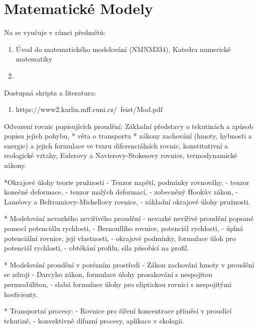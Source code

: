 \part{Matematické Modely} 

Na se vyučuje v rámci předmětů:

\begin{enumerate}
    \item Úvod do matematického modelování (NMNM334), Katedra numerické matematiky
    \item 
\end{enumerate}

Dostupná skripta a literatura:

\begin{enumerate}
    \item https://www2.karlin.mff.cuni.cz/~feist/Mod.pdf
\end{enumerate}

Odvození rovnic popisujících proudění:
Základní představy o tekutinách a způsob popisu jejich pohybu, 
* věta o transportu 
* zákony zachování (hmoty, hybnosti a energie) a jejich formulace ve tvaru diferenciálních rovnic, konstitutivní a reologické vztahy, Eulerovy a Navierovy-Stokesovy rovnice, termodynamické zákony.

*Okrajové úlohy teorie pružnosti
  - Tenzor napětí, podmínky rovnováhy, 
  - tenzor konečné deformace, 
  - tenzor malých deformací, 
  - zobecněný Hookův zákon, 
  - Laméovy a Beltramiovy-Michellovy rovnice, 
  - základní okrajové úlohy pružnosti.

* Modelování nevazkého neviřivého proudění
  - nevazké nevířivé proudění popsané pomocí potenciálu rychlosti, 
  - Bernoulliho rovnice, potenciál rychlosti, 
  - úplná potenciální rovnice, její vlastnosti, 
  - okrajové podmínky, formulace úloh pro potenciál rychlosti, 
  - obtékání profilu, síla působící na profil.

* Modelování proudění v porézním prostředí
 - Zákon zachování hmoty v proudění se zdroji
 - Darcyho zákon, formulace úlohy prosakování s nespojitou permeabilitou, 
 - slabá formulace úlohy pro eliptickou rovnici s nespojitými koeficienty.

* Transportní procesy:
 - Rovnice pro šíření koncentrace příměsí v proudící tekutině,
 -  konvektivně difuzní procesy, aplikace v ekologii.